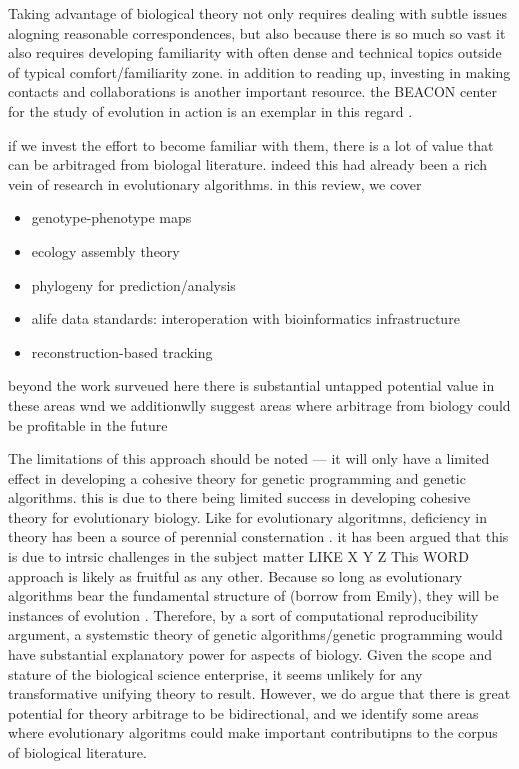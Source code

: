 Taking advantage of biological theory not only requires dealing with subtle issues alogning reasonable correspondences, but also because there is so much so vast it also requires developing familiarity with often dense and technical topics outside of typical comfort/familiarity zone.
in addition to reading up, investing in making contacts and collaborations is another important resource.
the BEACON center for the study of evolution in action is an exemplar in this regard \citep{goodman2020evolution}.

if we invest the effort to become familiar with them, there is a lot of value that can be arbitraged from biologal literature.
indeed this had already been a rich vein of research in evolutionary algorithms.
in this review, we cover
\begin{itemize}
  \item genotype-phenotype maps
  \item ecology assembly theory \citep{dolson2024reachability}
  \item phylogeny for prediction/analysis \citep{hernandez2022can,shahbandegan2022untangling}
  \item alife data standards: interoperation with bioinformatics infrastructure \citep{lalejini2019data,moreno2024apc}
  \item reconstruction-based tracking \citep{moreno2022hstrat,moreno2024ecology}
\end{itemize}
beyond the work surveued here there is substantial untapped potential value in these areas wnd we additionwlly suggest areas where arbitrage from biology could be profitable in the future

The limitations of this approach should be noted --- it will only have a limited effect in developing a cohesive theory for genetic programming and genetic algorithms.
this is due to there being limited success in developing cohesive theory for evolutionary biology.
Like for evolutionary algoritmns, deficiency in theory has been a source of perennial consternation \citep{welch2017wrong}.
it has been argued that this is due to intrsic challenges in the subject matter LIKE X Y Z
This WORD approach is likely as fruitful as any other.
Because so long as evolutionary algorithms bear the fundamental structure of (borrow from Emily), they will be instances of evolution \citep{pennock2007models}.
Therefore, by a sort of computational reproducibility argument, a systemstic theory of genetic algorithms/genetic programming would have substantial explanatory power for aspects of biology.
Given the scope and stature of the biological science enterprise, it seems unlikely for any transformative unifying theory to result.
However, we do argue that there is great potential for theory arbitrage to be bidirectional, and we identify some areas where evolutionary algoritms could make important contributipns to the corpus of biological literature.

